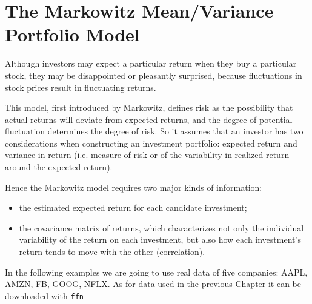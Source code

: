 \section{The Markowitz Mean/Variance Portfolio Model}
\label{the-markowitz-meanvariance-portfolio-model}

Although investors may expect a particular return when they buy a particular stock, they may be disappointed or pleasantly surprised, because fluctuations in stock prices result in fluctuating returns. 

This model, first introduced by Markowitz, defines risk as the possibility that actual returns will deviate from expected returns, and the degree of potential fluctuation determines the degree of risk.
So it assumes that an investor has two considerations when constructing an investment portfolio: expected return and variance in return (i.e. measure of risk or of the variability in realized return around the expected return). 

Hence the Markowitz model requires two major kinds of information:

\begin{itemize}
\tightlist
\item
  the estimated expected return for each candidate investment;
\item
  the covariance matrix of returns, which characterizes not only the 
  individual variability of the return on each investment, 
  but also how each investment's return tends to move with the other (correlation).
\end{itemize}

In the following examples we are going to use real data
of five companies:  AAPL, AMZN, FB, GOOG, NFLX. As for data used in the previous Chapter
it can be downloaded with \texttt{ffn}  


